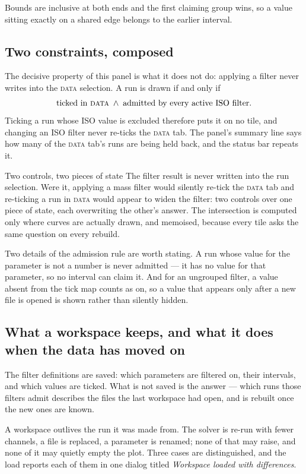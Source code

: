 \documentclass[11pt,a4paper,oneside]{report}
\newcommand{\tab}[1]{\textsc{#1}}
\begin{document}
Bounds are inclusive at both ends and the first claiming group wins, so a value
sitting exactly on a shared edge belongs to the earlier interval.

\subsection{Two constraints, composed}

The decisive property of this panel is what it does not do: applying a filter
never writes into the \tab{data} selection. A run is drawn if and only if
\[
  \text{ticked in \tab{data}} \;\wedge\; \text{admitted by every active ISO filter.}
\]
Ticking a run whose ISO value is excluded therefore puts it on no tile, and
changing an ISO filter never re-ticks the \tab{data} tab. The panel's summary
line says how many of the \tab{data} tab's runs are being held back, and the
status bar repeats it.

\begin{aoenote}{Two controls, two pieces of state}
The filter result is never written into the run selection. Were it, applying a
mass filter would silently re-tick the \tab{data} tab and re-ticking a run in
\tab{data} would appear to widen the filter: two controls over one piece of
state, each overwriting the other's answer. The intersection is computed only
where curves are actually drawn, and memoised, because every tile asks the same
question on every rebuild.
\end{aoenote}

Two details of the admission rule are worth stating. A run whose value for the
parameter is not a number is never admitted --- it has no value for that
parameter, so no interval can claim it. And for an ungrouped filter, a value
absent from the tick map counts as on, so a value that appears only after a new
file is opened is shown rather than silently hidden.

\subsection{What a workspace keeps, and what it does when the data has moved on}

The filter definitions are saved: which parameters are filtered on, their
intervals, and which values are ticked. What is not saved is the answer --- which
runs those filters admit describes the files the last workspace had open, and is
rebuilt once the new ones are known.

A workspace outlives the run it was made from. The solver is re-run with fewer
channels, a file is replaced, a parameter is renamed; none of that may raise, and
none of it may quietly empty the plot. Three cases are distinguished, and the
load reports each of them in one dialog titled \emph{Workspace loaded with
differences}.
\end{document}
